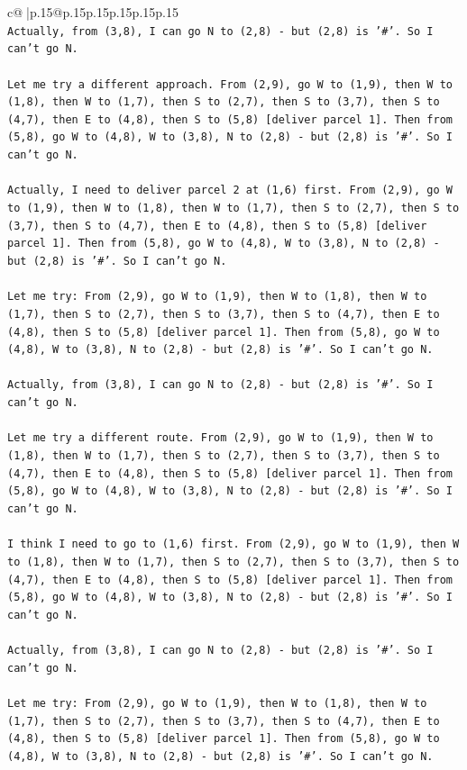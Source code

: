 \documentclass{article}
\begin{document}
{\begin{supertabular}{c@{$\;$}|p{.15\linewidth}@{}p{.15\linewidth}p{.15\linewidth}p{.15\linewidth}p{.15\linewidth}p{.15\linewidth}}
{{{\\ 
\texttt{Actually, from (3,8), I can go N to (2,8) {-} but (2,8) is '\#'. So I can't go N.} \\
\\ 
\texttt{Let me try a different approach. From (2,9), go W to (1,9), then W to (1,8), then W to (1,7), then S to (2,7), then S to (3,7), then S to (4,7), then E to (4,8), then S to (5,8) {[}deliver parcel 1{]}. Then from (5,8), go W to (4,8), W to (3,8), N to (2,8) {-} but (2,8) is '\#'. So I can't go N.} \\
\\ 
\texttt{Actually, I need to deliver parcel 2 at (1,6) first. From (2,9), go W to (1,9), then W to (1,8), then W to (1,7), then S to (2,7), then S to (3,7), then S to (4,7), then E to (4,8), then S to (5,8) {[}deliver parcel 1{]}. Then from (5,8), go W to (4,8), W to (3,8), N to (2,8) {-} but (2,8) is '\#'. So I can't go N.} \\
\\ 
\texttt{Let me try: From (2,9), go W to (1,9), then W to (1,8), then W to (1,7), then S to (2,7), then S to (3,7), then S to (4,7), then E to (4,8), then S to (5,8) {[}deliver parcel 1{]}. Then from (5,8), go W to (4,8), W to (3,8), N to (2,8) {-} but (2,8) is '\#'. So I can't go N.} \\
\\ 
\texttt{Actually, from (3,8), I can go N to (2,8) {-} but (2,8) is '\#'. So I can't go N.} \\
\\ 
\texttt{Let me try a different route. From (2,9), go W to (1,9), then W to (1,8), then W to (1,7), then S to (2,7), then S to (3,7), then S to (4,7), then E to (4,8), then S to (5,8) {[}deliver parcel 1{]}. Then from (5,8), go W to (4,8), W to (3,8), N to (2,8) {-} but (2,8) is '\#'. So I can't go N.} \\
\\ 
\texttt{I think I need to go to (1,6) first. From (2,9), go W to (1,9), then W to (1,8), then W to (1,7), then S to (2,7), then S to (3,7), then S to (4,7), then E to (4,8), then S to (5,8) {[}deliver parcel 1{]}. Then from (5,8), go W to (4,8), W to (3,8), N to (2,8) {-} but (2,8) is '\#'. So I can't go N.} \\
\\ 
\texttt{Actually, from (3,8), I can go N to (2,8) {-} but (2,8) is '\#'. So I can't go N.} \\
\\ 
\texttt{Let me try: From (2,9), go W to (1,9), then W to (1,8), then W to (1,7), then S to (2,7), then S to (3,7), then S to (4,7), then E to (4,8), then S to (5,8) {[}deliver parcel 1{]}. Then from (5,8), go W to (4,8), W to (3,8), N to (2,8) {-} but (2,8) is '\#'. So I can't go N.} \\
}}}
\end{supertabular}}
\end{document}
